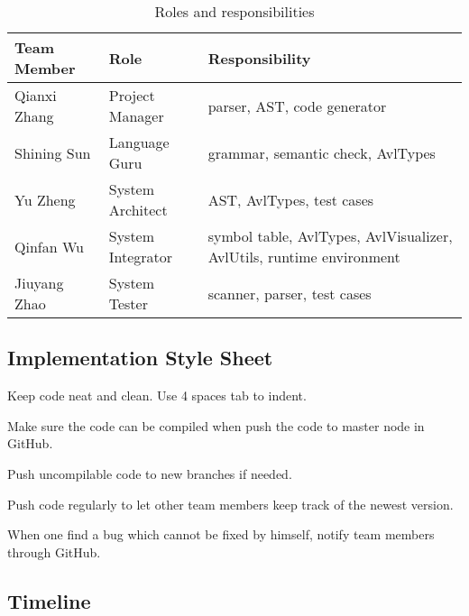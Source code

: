 \begin{table}[htp]
  \centering
  \begin{tabular}{|l|l|l|}
    \hline
    Team Member & Role & Responsibility \\
    \hline
    Qianxi Zhang & Project Manager & parser, AST, code generator \\
    \hline
    Shining Sun & Language Guru & grammar, semantic check, AvlTypes \\
    \hline
    Yu Zheng & System Architect & AST, AvlTypes, test cases \\
    \hline
    Qinfan Wu & System Integrator & symbol table, AvlTypes, AvlVisualizer, AvlUtils, runtime environment \\
    \hline
    Jiuyang Zhao & System Tester & scanner, parser, test cases \\
    \hline
  \end{tabular}
  \caption{Roles and responsibilities}
  \label{tab:roles}
\end{table}

\subsection{Implementation Style Sheet}

Keep code neat and clean. Use 4 spaces tab to indent.

Make sure the code can be compiled when push the code to master node in GitHub.

Push uncompilable code to new branches if needed.

Push code regularly to let other team members keep track of the newest version.

When one find a bug which cannot be fixed by himself, notify team members through GitHub.

\subsection{Timeline}

